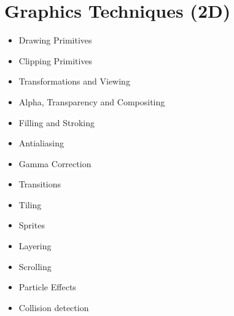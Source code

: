 \section{Graphics Techniques (2D)}
\begin{itemize}
    \item Drawing Primitives
    \item Clipping Primitives
    \item Transformations and Viewing
    \item Alpha, Transparency and Compositing
    \item Filling and Stroking
    \item Antialiasing
    \item Gamma Correction
    \item Transitions
    \item Tiling
    \item Sprites
    \item Layering
    \item Scrolling
    \item Particle Effects
    \item Collision detection
\end{itemize}

